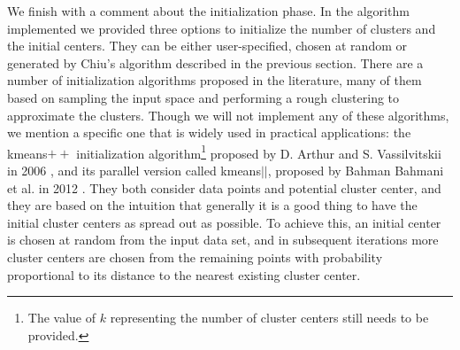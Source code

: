We finish with a comment about the initialization phase. In the algorithm implemented we provided three options to initialize the number of clusters and the initial centers. They can be either user-specified, chosen at random or generated by Chiu's algorithm described in the previous section. There are a number of initialization algorithms proposed in the literature, many of them based on sampling the input space and performing a rough clustering to approximate the clusters. Though we will not implement any of these algorithms, we mention a specific one that is widely used in practical applications: the kmeans$++$ initialization algorithm\footnote{The value of $k$ representing the number of cluster centers still needs to be provided.} proposed by D. Arthur and S. Vassilvitskii in 2006 \cite{arthur2006k}, and its parallel version called kmeans$||$, proposed by Bahman Bahmani et al. in 2012 \cite{bahmani2012scalable}. They both consider data points and potential cluster center, and they are based on the intuition that generally it is a good thing to have the initial cluster centers as spread out as possible. To achieve this, an initial center is chosen at random from the input data set, and in subsequent iterations more cluster centers are chosen from the remaining points with probability proportional to its distance to the nearest existing cluster center.
